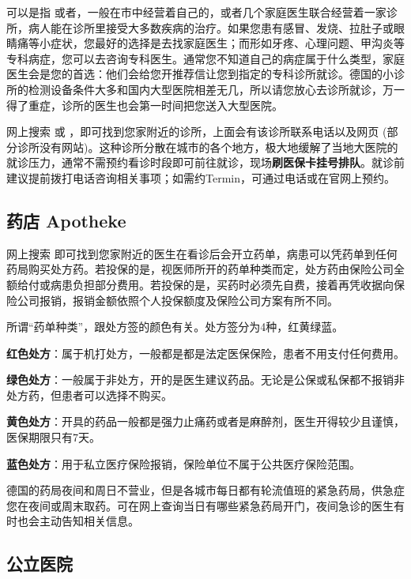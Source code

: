      可以是指 或者，一般在市中经营着自己的，或者几个家庭医生联合经营着一家诊所，病人能在诊所里接受大多数疾病的治疗。如果您患有感冒、发烧、拉肚子或眼睛痛等小症状，您最好的选择是去找家庭医生；而形如牙疼、心理问题、甲沟炎等专科病症，您可以去咨询专科医生。通常您不知道自己的病症属于什么类型，家庭医生会是您的首选：他们会给您开推荐信让您到指定的专科诊所就诊。德国的小诊所的检测设备条件大多和国内大型医院相差无几，所以请您放心去诊所就诊，万一得了重症，诊所的医生也会第一时间把您送入大型医院。

    网上搜索 或 ，即可找到您家附近的诊所，上面会有该诊所联系电话以及网页 (部分诊所没有网站)。这种诊所分散在城市的各个地方，极大地缓解了当地大医院的就诊压力，通常不需预约看诊时段即可前往就诊，现场\textbf{刷医保卡挂号排队}。就诊前建议提前拨打电话咨询相关事项；如需约Termin，可通过电话或在官网上预约。

  \subsection{药店 Apotheke}\label{subsec:药店 Apotheke}

    网上搜索  即可找到您家附近的医生在看诊后会开立药单，病患可以凭药单到任何药局购买处方药。若投保的是，视医师所开的药单种类而定，处方药由保险公司全额给付或病患负担部分费用。若投保的是，买药时必须先自费，接着再凭收据向保险公司报销，报销金额依照个人投保额度及保险公司方案有所不同。

    所谓``药单种类''，跟处方签的颜色有关。处方签分为4种，红黄绿蓝。

    \textbf{红色处方}：属于机打处方，一般都是都是法定医保保险，患者不用支付任何费用。

    \textbf{绿色处方}：一般属于非处方，开的是医生建议药品。无论是公保或私保都不报销非处方药，但患者可以选择不购买。

    \textbf{黄色处方}：开具的药品一般都是强力止痛药或者是麻醉剂，医生开得较少且谨慎，医保期限只有7天。

    \textbf{蓝色处方}：用于私立医疗保险报销，保险单位不属于公共医疗保险范围。

    德国的药局夜间和周日不营业，但是各城市每日都有轮流值班的紧急药局，供急症您在夜间或周末取药。可在网上查询当日有哪些紧急药局开门，夜间急诊的医生有时也会主动告知相关信息。

  \subsection{公立医院}\label{subsec:公立医院}


